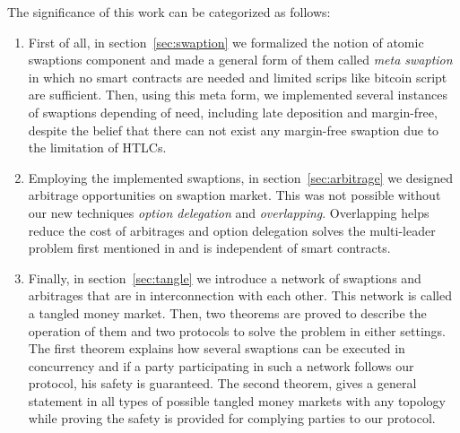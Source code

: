 The significance of this work can be categorized as follows:
\begin{enumerate}
    \item First of all, in section~\ref{sec:swaption} we formalized the notion of atomic swaptions component and made a general form of them called \emph{meta swaption} in which no smart contracts are needed and limited scrips like bitcoin script are sufficient. Then, using this meta form, we implemented several instances of swaptions depending of need, including late deposition and margin-free, despite the belief that there can not exist any margin-free swaption due to the limitation of HTLCs. 
    
    \item Employing the implemented swaptions, in section~\ref{sec:arbitrage} we designed arbitrage opportunities on swaption market. This was not possible without our new techniques \emph{option delegation} and \emph{overlapping}. Overlapping helps reduce the cost of arbitrages and option delegation solves the multi-leader problem first mentioned in \cite{herlihy2018atomic} and is independent of smart contracts.
    
    \item Finally, in section~\ref{sec:tangle} we introduce a network of swaptions and arbitrages that are in interconnection with each other. This network is called a tangled money market. Then, two theorems are proved to describe the operation of them and two protocols to solve the problem in either settings. The first theorem explains how several swaptions can be executed in concurrency and if a party participating in such a network follows our protocol, his safety is guaranteed. The second theorem, gives a general statement in all types of possible tangled money markets with any topology while proving the safety is provided for complying parties to our protocol. 
    
    
\end{enumerate}



